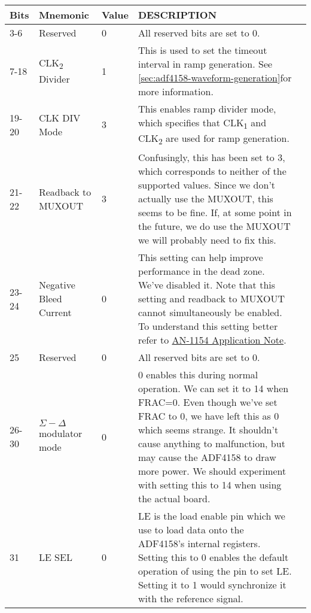 \documentclass{default}
\begin{document}
\label{tab:adf4158-reg-map-4}
\begin{tabularx}{\textwidth}{l l l X>{\raggedright\arraybackslash}X}
  \caption{TEST REGISTER(R4) MAP} \\
  \toprule
  \textbf{Bits} & \textbf{Mnemonic} & \textbf{Value} & \textbf{DESCRIPTION} \\
  \midrule

  \endhead

  3-6 & Reserved & 0 & All reserved bits are set to 0. \\
  7-18 & CLK\textsubscript{2} Divider & 1 & This is used to set the timeout interval in ramp
  generation. See \cref{sec:adf4158-waveform-generation}for more information. \\
  19-20 & CLK DIV Mode & 3 & This enables ramp divider mode, which specifies that
  CLK\textsubscript{1} and CLK\textsubscript{2} are used for ramp generation. \\
  21-22 & Readback to MUXOUT & 3 & Confusingly, this has been set to 3, which corresponds to neither
  of the supported values. Since we don't actually use the MUXOUT, this seems to be fine. If, at
  some point in the future, we do use the MUXOUT we will probably need to fix this. \\
  23-24 & Negative Bleed Current & 0 & This setting can help improve performance in the dead
  zone. We've disabled it. Note that this setting and readback to MUXOUT cannot simultaneously be
  enabled. To understand this setting better refer to
  \href{http://www.analog.com/media/en/technical-documentation/application-notes/AN-1154.pdf?doc=ADF4158.pdf}{AN-1154
    Application Note}. \\
  25 & Reserved & 0 & All reserved bits are set to 0. \\
  26-30 & $\Sigma-\Delta$ modulator mode & 0 & 0 enables this during normal operation. We can set it
  to 14 when FRAC=0. Even though we've set FRAC to 0, we have left this as 0 which seems strange. It
  shouldn't cause anything to malfunction, but may cause the ADF4158 to draw more power. We should
  experiment with setting this to 14 when using the actual board. \\
  31 & LE SEL & 0 & LE is the load enable pin which we use to load data onto the ADF4158's internal
  registers. Setting this to 0 enables the default operation of using the pin to set LE. Setting it
  to 1 would synchronize it with the reference signal. \\

  \bottomrule
\end{tabularx}
\end{document}
